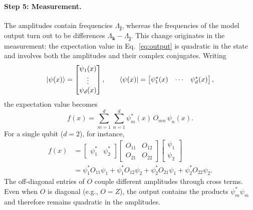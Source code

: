 \documentclass[12pt]{article}
\numberwithin{equation}{section}  %
\begin{document}
\paragraph{Step 5: Measurement.} The amplitudes contain frequencies $\Lambda_{\mathbf{j}}$, whereas the frequencies of the model output turn out to be differences $\Lambda_{\mathbf{k}} - \Lambda_{\mathbf{j}}$. This change originates in the measurement: the expectation value in Eq.~\eqref{eq:output} is quadratic in the state and involves both the amplitudes and their complex conjugates. Writing
\begin{equation}
\ket{\psi(x)} = \begin{bmatrix} \psi_1(x) \\ \vdots \\ \psi_d(x) \end{bmatrix}, \qquad
\bra{\psi(x)} = \begin{bmatrix} \psi_1^*(x) & \cdots & \psi_d^*(x) \end{bmatrix},
\end{equation}
the expectation value becomes
\begin{equation}
f(x) = \sum_{m=1}^{d}\sum_{n=1}^{d} \psi_m^*(x)\, O_{mn}\, \psi_n(x).
\label{eq:expectation_sum}
\end{equation}
For a single qubit ($d = 2$), for instance,
\begin{equation}
\begin{aligned}
f(x) &= \begin{bmatrix} \psi_1^* & \psi_2^* \end{bmatrix}
\begin{bmatrix} O_{11} & O_{12} \\ O_{21} & O_{22} \end{bmatrix}
\begin{bmatrix} \psi_1 \\ \psi_2 \end{bmatrix} \\
&= \psi_1^* O_{11} \psi_1 + \psi_1^* O_{12} \psi_2 + \psi_2^* O_{21} \psi_1 + \psi_2^* O_{22} \psi_2.
\end{aligned}
\end{equation}
The off-diagonal entries of $O$ couple different amplitudes through cross terms. Even when $O$ is diagonal (e.g., $O = Z$), the output contains the products $\psi_m^* \psi_m$ and therefore remains quadratic in the amplitudes.
\end{document}
